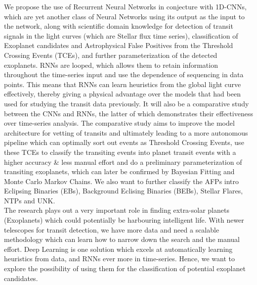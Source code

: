We propose the use of Recurrent Neural Networks in conjecture with 1D-CNNs, which are yet another class of Neural Networks using its output as the input to the network, along with scientific domain knowledge for detection of transit signals in the light curves (which are Stellar flux time series), classification of Exoplanet candidates and Astrophysical False Positives from the Threshold Crossing Events (TCEs), and further parameterization of the detected exoplanets. RNNs are looped, which allows them to retain information throughout the time-series input and use the dependence of sequencing in data points. This means that RNNs can learn heuristics from the global light curve effectively, thereby giving a physical advantage over the models that had been used for studying the transit data previously. It will also be a comparative study between the CNNs and RNNs, the latter of which demonstrates their effectiveness over time-series analysis. The comparative study aims to improve the model architecture for vetting of transits and ultimately leading to a more autonomous pipeline which can optimally sort out events as Threshold Crossing Events, use these TCEs to classify the transiting events into planet transit events with a higher accuracy \& less manual effort and do a preliminary parameterization of transiting exoplanets, which can later be confirmed by Bayesian Fitting and Monte Carlo Markov Chains. We also want to further classify the AFPs intro Eclipsing Binaries (EBs), Background Eclising Binaries (BEBs), Stellar Flares, NTPs and UNK.\\

The research plays out a very important role in finding extra-solar planets (Exoplanets) which could potentially be harbouring intelligent life. With newer telescopes for transit detection, we have more data and need a scalable methodology which can learn how to narrow down the search and the manual effort. Deep Learning is one solution which excels at automatically learning heuristics from data, and RNNs ever more in time-series. Hence, we want to explore the possibility of using them for the classification of potential exoplanet candidates.